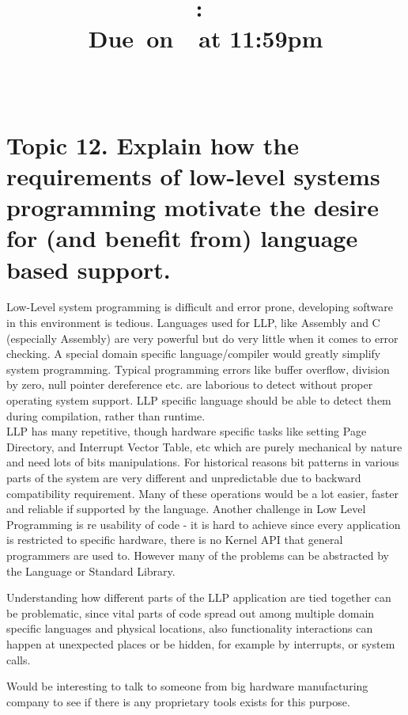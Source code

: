 \documentclass{article}
\title{
    \vspace{2in}
    \textmd{\textbf{\hmwkClass:\ \hmwkTitle}}\\
        \normalsize\vspace{0.1in}\small{Due\ on\ \hmwkDueDate\ at 11:59pm}\\
        \vspace{0.1in}\large{\textit{\hmwkClassInstructor\ \hmwkClassTime}}
    \vspace{3in}
}
\author{\textbf{\hmwkAuthorName}}
\date{}
\begin{document}
\maketitle

\pagebreak

        \section{Topic 12. Explain how the requirements of low-level systems programming motivate the desire
        for (and benefit from) language based support.}

        Low-Level system programming is difficult and error prone, developing software in this
        environment is tedious. Languages used for LLP, like Assembly and C  (especially
        Assembly) are very powerful but do very little when it comes to error checking. A
        special domain specific language/compiler would greatly simplify system programming.
        Typical programming errors like buffer overflow, division by zero, null pointer
        dereference etc. are laborious to detect without proper operating system support.
        LLP specific language should be able to detect them during compilation, rather than
        runtime.
        \\

        LLP has many repetitive, though hardware specific tasks like setting Page Directory,
        and Interrupt Vector Table, etc which are purely mechanical by nature and need lots of
        bits manipulations. For historical reasons bit patterns in various parts of the system
        are very different and unpredictable due to backward compatibility requirement. Many
        of these operations would be a lot easier, faster and reliable if supported by the
        language. 
        Another challenge in Low Level Programming is re usability of code - it is hard to
        achieve since every application is restricted  to specific hardware, there is no
        Kernel API that general programmers are used to. 
        However many of the problems can be abstracted by the Language or Standard Library.

        Understanding how different parts of the LLP application are tied together can be
        problematic, since vital parts of code spread out among multiple domain specific
        languages and physical locations, also functionality interactions can happen at
        unexpected places or be hidden, for example by interrupts, or system calls.

        \vspace{0.5cm}
        Would be interesting to talk to someone from big hardware manufacturing company to see
        if there is any proprietary tools exists for this purpose.
       

\end{document}
